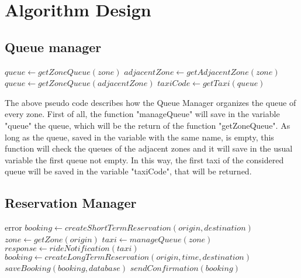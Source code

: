 \section{Algorithm Design}
\subsection{Queue manager}
\begin{algorithmic}
		\State $queue\gets getZoneQueue(zone)$
				\State $adjacentZone \gets getAdjacentZone(zone)$
				\State $queue\gets getZoneQueue(adjacentZone)$
		\EndWhile
		\State $taxiCode \gets getTaxi(queue)$
		\State {}
	\EndFunction
\end{algorithmic}


\vspace{0.5cm}

The above pseudo code describes how the Queue Manager organizes the queue of every zone. 
First of all, the function "manageQueue" will save in the variable "queue" the queue, which will be the return of the function "getZoneQueue". 
As long as the queue, saved in the variable with the same name, is empty, this function will check the queues of the adjacent zones and it will save in the usual variable the first queue not empty.
In this way, the first taxi of the considered queue will be saved in the variable "taxiCode", that will be returned.

\newpage
\subsection{Reservation Manager}
\begin{algorithmic}
			\State \Return error 
		\EndIf
			\State $booking \gets createShortTermReservation(origin, destination)$
			\State $zone \gets getZone(origin)$
				\State $taxi \gets manageQueue(zone)$
				\State $response \gets rideNotification(taxi)$
			\EndWhile	
		\Else 
			\State $booking \gets createLongTermReservation(origin, time, destination)$
			\State $saveBooking(booking, database)$
			\State \Return
		\EndIf
		\State $sendConfirmation(booking)$
		\State \Return
	\EndFunction
\end{algorithmic}

